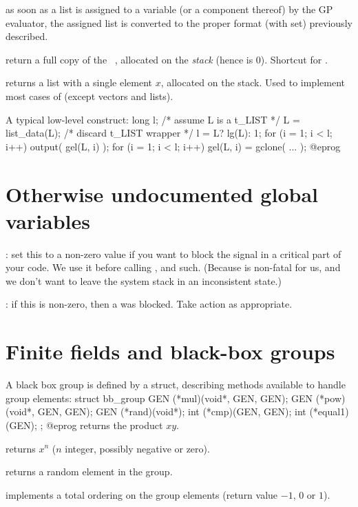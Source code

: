 \item as soon as a list is assigned to a variable (or a component thereof)
by the GP evaluator, the assigned list is converted to the proper format
(with  set) previously described.

 return a full copy of the ~,
allocated on the \emph{stack} (hence  is $0$). Shortcut for
.

 returns a list with a single element $x$,
allocated on the stack. Used to implement most cases of 
(except vectors and lists).

A typical low-level construct:
\bprog
  long l;
  /* assume L is a t_LIST */
  L = list_data(L); /* discard t_LIST wrapper */
  l = L? lg(L): 1;
  for (i = 1; i < l; i++) output( gel(L, i) );
  for (i = 1; i < l; i++) gel(L, i) = gclone( ... );
@eprog\noindent

\section{Otherwise undocumented global variables}

: set this to a non-zero value if you want to block
the  signal in a critical part of your code. We use it
before calling ,  and such. (Because 
is non-fatal for us, and we don't want to leave the system stack in an
inconsistent state.)

: if this is non-zero, then a  was
blocked. Take action as appropriate.

\section{Finite fields and black-box groups}

A black box group is defined by a  struct, describing methods
available to handle group elements:
\bprog
    struct bb_group
    {
      GEN (*mul)(void*, GEN, GEN);
      GEN (*pow)(void*, GEN, GEN);
      GEN (*rand)(void*);
      int (*cmp)(GEN, GEN);
      int (*equal1)(GEN);
    };
@eprog
 returns the product $xy$.

 returns $x^n$ ($n$ integer, possibly negative or zero).

 returns a random element in the group.

 implements a total ordering on the group elements
(return value $-1$, $0$ or $1$).

